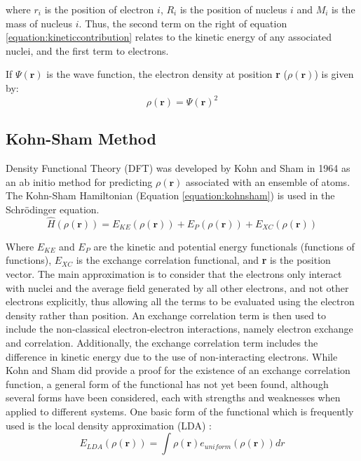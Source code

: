 where $r_{i}$ is the position of electron $i$, $R_{i}$ is the position of nucleus $i$ and $M_{i}$ is the mass of nucleus $i$. Thus, the second term on the right of equation \ref{equation:kineticcontribution} relates to the kinetic energy of any associated nuclei, and the first term to electrons. 

If $\Psi(\textbf{r})$ is the wave function, the electron density at position \textbf{r} ($\rho(\textbf{r})$) is given by:
\begin{equation}
\rho(\textbf{r}) = \Psi(\textbf{r})^2
\end{equation}

\subsection{Kohn-Sham Method} \label{section:kohnsham}

Density Functional Theory (DFT) was developed by Kohn and Sham in 1964 \cite{Kohn1965} as an ab initio method for predicting $\rho(\textbf{r})$ associated with an ensemble of atoms. The Kohn-Sham Hamiltonian (Equation \ref{equation:kohnsham}) is used in the Schr\"odinger equation.
\begin{equation}
\hat{H}(\rho(\textbf{r})) = E_{KE}(\rho(\textbf{r})) + E_{P}(\rho(\textbf{r})) + E_{XC}(\rho(\textbf{r}))
\label{equation:kohnsham}
\end{equation}

Where $E_{KE}$ and $E_{P}$ are the kinetic and potential energy functionals (functions of functions), $E_{XC}$ is the exchange correlation functional, and \textbf{r} is the position vector. The main approximation is to consider that the electrons only interact with nuclei and the average field generated by all other electrons, and not other electrons explicitly, thus allowing all the terms to be evaluated using the electron density rather than position. An exchange correlation term is then used to include the non-classical electron-electron interactions, namely electron exchange and correlation. Additionally, the exchange correlation term includes the difference in kinetic energy due to the use of non-interacting electrons. While Kohn and Sham did provide a proof for the existence of an exchange correlation function, a general form of the functional has not yet been found, although several forms have been considered, each with strengths and weaknesses when applied to different systems. One basic form of the functional which is frequently used is the local density approximation (LDA) \cite{Kohn1965}:
\begin{equation}
E_{LDA}(\rho(\textbf{r})) = \int\rho(\textbf{r})e_{uniform}(\rho(\textbf{r}))dr
\label{equation:LDA}
\end{equation}

